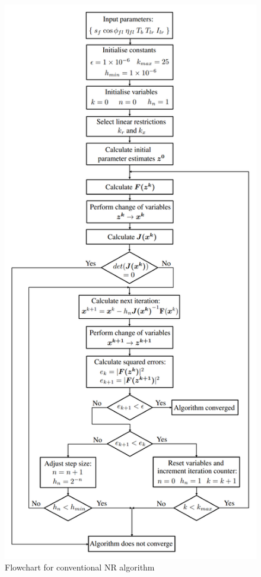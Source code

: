 \documentclass{article}
\begin{document}
\begin{figure}
\begin{center}
\includegraphics[scale=0.42]{./Figures/Algo_Flowchart.pdf}
\caption{Flowchart for conventional NR algorithm}
\label{fig:algo_flowchart}
\end{center}
\end{figure}
\end{document}
